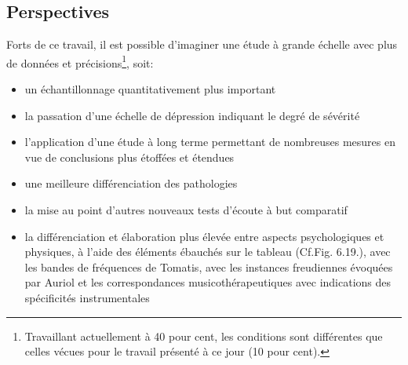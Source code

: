 
  



\subsection{Perspectives}
Forts de ce travail, il est possible d'imaginer une étude à  grande
échelle avec plus de données et précisions\footnote{Travaillant
actuellement à 40 pour
cent, les conditions sont différentes que celles vécues pour le
travail présenté à ce jour (10 pour cent).}, soit: 

\begin{itemize}
  
\item un échantillonnage quantitativement plus important
 \item la passation d'une échelle de
     dépression indiquant le degré de sévérité
\item  l'application d'une étude à long terme permettant de nombreuses
  mesures en vue de conclusions plus étoffées et étendues
 
   \item  une meilleure différenciation des pathologies
     \item la mise au point  d'autres nouveaux tests d'écoute à but 
       comparatif
     \item la différenciation et élaboration plus élevée entre aspects 
       psychologiques et physiques, à l'aide des éléments ébauchés sur
       le tableau (Cf.Fig. 6.19.), avec les bandes de fréquences de
       Tomatis, avec les instances freudiennes évoquées par Auriol et
       les correspondances musicothérapeutiques avec indications des
       spécificités instrumentales
       
     

 
 

  

\end{itemize}
